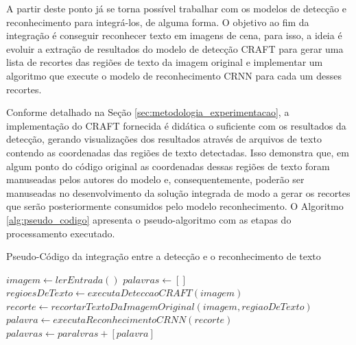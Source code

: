 A partir deste ponto já se torna possível trabalhar com os modelos de detecção e reconhecimento para integrá-los, de alguma forma. O objetivo ao fim da integração 
é conseguir reconhecer texto em imagens de cena, para isso, a ideia é evoluir a extração de resultados do modelo de detecção CRAFT para gerar uma lista de 
recortes das regiões de texto da imagem original e implementar um algoritmo que execute o modelo de reconhecimento CRNN para cada um desses recortes.

Conforme detalhado na Seção \ref{sec:metodologia_experimentacao}, a implementação do CRAFT fornecida é didática o suficiente com os resultados da detecção, 
gerando visualizações dos resultados através de arquivos de texto contendo as coordenadas das regiões de texto detectadas. Isso demonstra que, em algum ponto 
do código original as coordenadas dessas regiões de texto foram manuseadas pelos autores do modelo e, consequentemente, poderão ser manuseadas no 
desenvolvimento da solução integrada de modo a gerar os recortes que serão posteriormente consumidos pelo modelo reconhecimento. O Algoritmo \ref{alg:pseudo_codigo} 
apresenta o pseudo-algoritmo com as etapas do processamento executado.


\begin{algorithm}
\caption{Pseudo-Código da integração entre a detecção e o reconhecimento de texto}\label{alg:pseudo_codigo}
\begin{algorithmic}
\State $imagem \gets{lerEntrada()}$
\State $palavras \gets{[ ]}$
\State $regioesDeTexto \gets{executaDeteccaoCRAFT(imagem)}$
    \State $recorte \gets{recortarTextoDaImagemOriginal(imagem,regiaoDeTexto)}$
    \State $palavra \gets{executaReconhecimentoCRNN(recorte)}$
    \State $palavras \gets{paralvras + [palavra]}$
\EndFor
\State{}
\end{algorithmic}
\end{algorithm}

